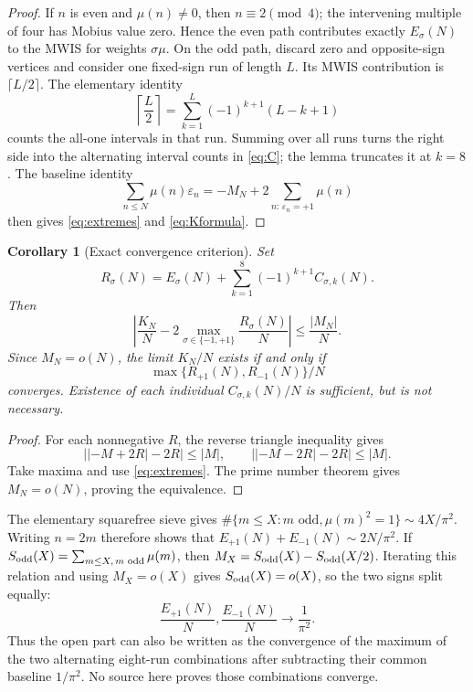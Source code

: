 \documentclass[11pt]{article}
\newtheorem{corollary}[theorem]{Corollary}
\newcommand{\Mob}{\mu}
\begin{document}
\begin{proof}
If $n$ is even and $\Mob(n)\ne0$, then $n\equiv2\pmod4$; the intervening
multiple of four has Mobius value zero.  Hence the even path contributes
exactly $E_\sigma(N)$ to the MWIS for weights $\sigma\Mob$.  On the odd path,
discard zero and opposite-sign vertices and consider one fixed-sign run of
length $L$.  Its MWIS contribution is $\lceil L/2\rceil$.  The elementary
identity
\begin{equation}
 \left\lceil\frac L2\right\rceil
 =\sum_{k=1}^{L}(-1)^{k+1}(L-k+1)
 \label{eq:ceilidentity}
\end{equation}
counts the all-one intervals in that run.  Summing over all runs turns the
right side into the alternating interval counts in \eqref{eq:C}; the lemma
truncates it at $k=8$.  The baseline identity
\[
 \sum_{n\leq N}\Mob(n)\varepsilon_n
 =-M_N+2\sum_{n:\,\varepsilon_n=+1}\Mob(n)
\]
then gives \eqref{eq:extremes} and \eqref{eq:Kformula}.
\end{proof}

\begin{corollary}[Exact convergence criterion]
Set
\begin{equation}
 R_\sigma(N)=E_\sigma(N)+
 \sum_{k=1}^{8}(-1)^{k+1}C_{\sigma,k}(N).
 \label{eq:R}
\end{equation}
Then
\begin{equation}
 \left|\frac{K_N}{N}-2\max_{\sigma\in\{-1,+1\}}
 \frac{R_\sigma(N)}{N}\right|\leq\frac{|M_N|}{N}.
 \label{eq:criterionbound}
\end{equation}
Since $M_N=o(N)$, the limit $K_N/N$ exists if and only if
\begin{equation}
 \max\{R_{+1}(N),R_{-1}(N)\}/N
 \label{eq:maxcriterion}
\end{equation}
converges.  Existence of each individual $C_{\sigma,k}(N)/N$ is sufficient,
but is not necessary.
\end{corollary}

\begin{proof}
For each nonnegative $R$, the reverse triangle inequality gives
\[
 \bigl||-M+2R|-2R\bigr|\leq|M|,
 \qquad
 \bigl||-M-2R|-2R\bigr|\leq|M|.
\]
Take maxima and use \eqref{eq:extremes}.  The prime number theorem gives
$M_N=o(N)$, proving the equivalence.
\end{proof}

The elementary squarefree sieve gives
$\#\{m\leq X:m\text{ odd},\Mob(m)^2=1\}\sim4X/\pi^2$.  Writing $n=2m$
therefore shows that $E_{+1}(N)+E_{-1}(N)\sim2N/\pi^2$.  If
$S_{\rm odd}(X)=\sum_{m\leq X,\,m\text{ odd}}\Mob(m)$, then
$M_X=S_{\rm odd}(X)-S_{\rm odd}(X/2)$.  Iterating this relation and using
$M_X=o(X)$ gives $S_{\rm odd}(X)=o(X)$, so the two signs split equally:
\begin{equation}
 \frac{E_{+1}(N)}N,\frac{E_{-1}(N)}N\longrightarrow\frac1{\pi^2}.
 \label{eq:Edensity}
\end{equation}
Thus the open part can also be written as the convergence of the maximum of
the two alternating eight-run combinations after subtracting their common
baseline $1/\pi^2$.  No source here proves those combinations converge.
\end{document}
